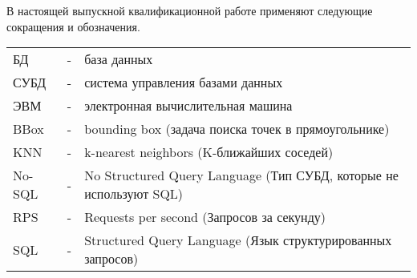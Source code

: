 В настоящей выпускной квалификационной работе применяют следующие
сокращения и обозначения.


\vspace{1em}

\noindent
\begin{tabularx}{\textwidth}{m{2cm} m{0.5cm} X}
БД & - & база данных \\
СУБД & - & система управления базами данных \\
ЭВМ & - & электронная вычислительная машина \\
BBox & - & bounding box (задача поиска точек в прямоугольнике) \\
KNN & - & k-nearest neighbors (K-ближайших соседей) \\
No-SQL & - & No Structured Query Language (Тип СУБД, которые не используют SQL) \\
RPS & - & Requests per second (Запросов за секунду) \\
SQL & - & Structured Query Language (Язык структурированных запросов) \\
\end{tabularx}

